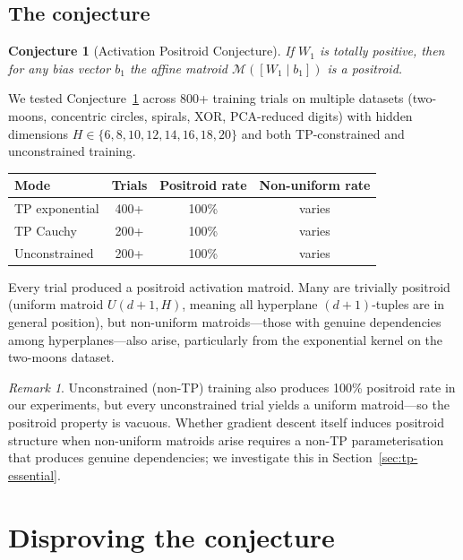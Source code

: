 \documentclass[11pt]{article}
\newtheorem{conjecture}[theorem]{Conjecture}
\theoremstyle{definition}
\theoremstyle{remark}
\newtheorem{remark}[theorem]{Remark}
\newcommand{\cM}{\mathcal{M}}
\begin{document}
\subsection{The conjecture}\label{sec:conjecture}

\begin{conjecture}[Activation Positroid Conjecture]
\label{conj:apc}
  If $W_1$ is totally positive, then for any bias vector $b_1$ the
  affine matroid $\cM([W_1 \mid b_1])$ is a positroid.
\end{conjecture}

We tested Conjecture~\ref{conj:apc} across 800+ training trials on
multiple datasets (two-moons, concentric circles, spirals, XOR,
PCA-reduced digits) with hidden dimensions $H \in \{6, 8, 10, 12,
14, 16, 18, 20\}$ and both TP-constrained and unconstrained training.

\begin{center}
\begin{tabular}{lccc}
  \toprule
  \textbf{Mode} & \textbf{Trials} & \textbf{Positroid rate} & \textbf{Non-uniform rate} \\
  \midrule
  TP exponential & 400+ & 100\% & varies \\
  TP Cauchy      & 200+ & 100\% & varies \\
  Unconstrained  & 200+ & 100\% & varies \\
  \bottomrule
\end{tabular}
\end{center}

Every trial produced a positroid activation matroid.  Many are
trivially positroid (uniform matroid $U(d{+}1, H)$, meaning all
hyperplane $(d{+}1)$-tuples are in general position), but
non-uniform matroids---those with genuine dependencies among
hyperplanes---also arise, particularly from the exponential kernel on
the two-moons dataset.

\begin{remark}
  Unconstrained (non-TP) training also produces 100\% positroid rate
  in our experiments, but every unconstrained trial yields a uniform
  matroid---so the positroid property is vacuous.  Whether gradient
  descent itself induces positroid structure when non-uniform matroids
  arise requires a non-TP parameterisation that produces genuine
  dependencies; we investigate this in
  Section~\ref{sec:tp-essential}.
\end{remark}


\section{Disproving the conjecture}\label{sec:counterexamples}
\end{document}

